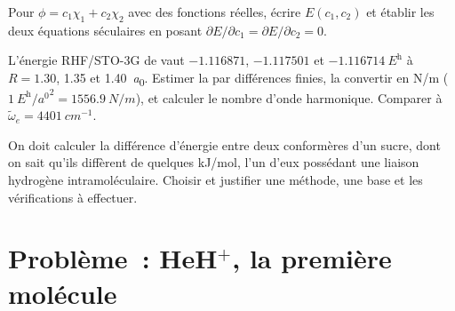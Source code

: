 \begin{exercise}[$\star\star\star$]\label{exo:b3:computational-chemistry:10}
Pour $\phi = c_1\chi_1 + c_2\chi_2$ avec des fonctions réelles, écrire
$E(c_1,c_2)$ et établir les deux équations séculaires en posant
$\partial E/\partial c_1 =
\partial E/\partial c_2 = 0$.
\end{exercise}

\begin{exercise}[$\star\star\star$]\label{exo:b3:computational-chemistry:11}
L'énergie RHF/STO-3G de  vaut $-1.116871$, $-1.117501$ et
$\qty{-1.116714}{\hartree}$ à $R = 1.30$, 1.35 et \qty{1.40}{\bohr}.
Estimer la  par différences finies, la convertir en
\unit{N/m}
($\qty{1}{\hartree\per\bohr\squared} = \qty{1556.9}{N/m}$), et calculer le
nombre d'onde harmonique. Comparer à $\tilde\omega_e = \qty{4401}{cm^{-1}}$.
\end{exercise}

\begin{exercise}[$\star\star\star$]\label{exo:b3:computational-chemistry:12}
On doit calculer la différence d'énergie entre deux conformères d'un
sucre, dont on sait qu'ils diffèrent de quelques \unit{kJ/mol}, l'un
d'eux possédant une liaison hydrogène intramoléculaire. Choisir et
justifier une méthode, une base et les vérifications à effectuer.
\end{exercise}

\section{Problème~: HeH\texorpdfstring{$^+$}{+}, la première molécule}

